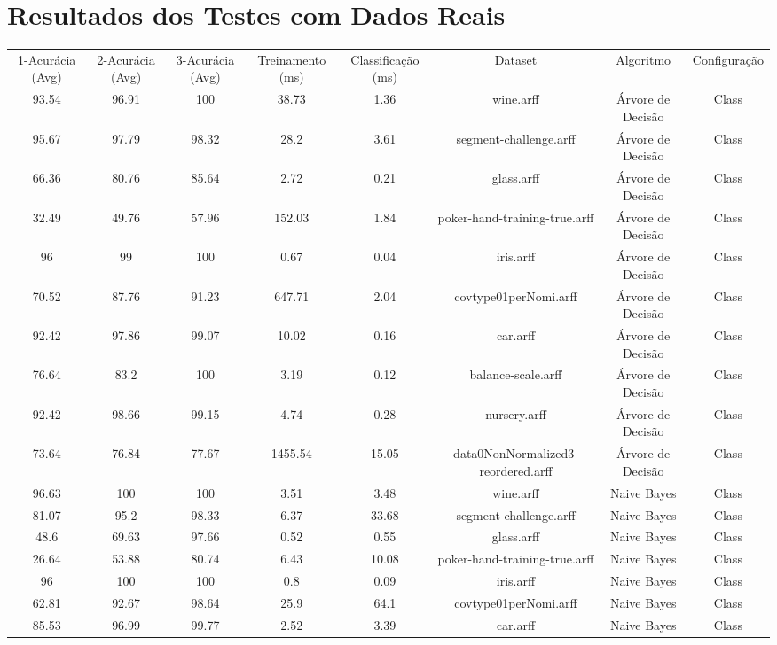 \chapter{Resultados dos Testes com Dados Reais}

\setlength\LTleft{0pt}
\setlength\LTright{0pt}
\begin{longtable}{@{\extracolsep{}}cccccccc}
\hline
1-Acurácia (Avg)	&	 2-Acurácia (Avg)	&	 3-Acurácia (Avg)	&	Treinamento (ms)	&	Classificação (ms)	&	 Dataset	&	 Algoritmo	&	Configuração	\\
93.54	&	96.91	&	100	&	38.73	&	1.36	&	 wine.arff	&	 Árvore de Decisão	&	Class	\\
95.67	&	97.79	&	98.32	&	28.2	&	3.61	&	 segment-challenge.arff	&	 Árvore de Decisão	&	Class	\\
66.36	&	80.76	&	85.64	&	2.72	&	0.21	&	 glass.arff	&	 Árvore de Decisão	&	Class	\\
32.49	&	49.76	&	57.96	&	152.03	&	1.84	&	 poker-hand-training-true.arff	&	 Árvore de Decisão	&	Class	\\
96	&	99	&	100	&	0.67	&	0.04	&	 iris.arff	&	 Árvore de Decisão	&	Class	\\
70.52	&	87.76	&	91.23	&	647.71	&	2.04	&	 covtype01perNomi.arff	&	 Árvore de Decisão	&	Class	\\
92.42	&	97.86	&	99.07	&	10.02	&	0.16	&	 car.arff	&	 Árvore de Decisão	&	Class	\\
76.64	&	83.2	&	100	&	3.19	&	0.12	&	 balance-scale.arff	&	 Árvore de Decisão	&	Class	\\
92.42	&	98.66	&	99.15	&	4.74	&	0.28	&	 nursery.arff	&	 Árvore de Decisão	&	Class	\\
73.64	&	76.84	&	77.67	&	1455.54	&	15.05	&	 data0NonNormalized3-reordered.arff	&	 Árvore de Decisão	&	Class	\\
96.63	&	100	&	100	&	3.51	&	3.48	&	 wine.arff	&	 Naive Bayes	&	Class	\\
81.07	&	95.2	&	98.33	&	6.37	&	33.68	&	 segment-challenge.arff	&	 Naive Bayes	&	Class	\\
48.6	&	69.63	&	97.66	&	0.52	&	0.55	&	 glass.arff	&	 Naive Bayes	&	Class	\\
26.64	&	53.88	&	80.74	&	6.43	&	10.08	&	 poker-hand-training-true.arff	&	 Naive Bayes	&	Class	\\
96	&	100	&	100	&	0.8	&	0.09	&	 iris.arff	&	 Naive Bayes	&	Class	\\
62.81	&	92.67	&	98.64	&	25.9	&	64.1	&	 covtype01perNomi.arff	&	 Naive Bayes	&	Class	\\
85.53	&	96.99	&	99.77	&	2.52	&	3.39	&	 car.arff	&	 Naive Bayes	&	Class	\\

\end{longtable}

